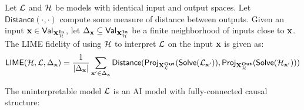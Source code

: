 \documentclass[twoside,11pt]{article}
\begin{document}
\begin{definition}

Let $\lowmodel$ and $\highmodel$ be models with identical input and output spaces. Let $\mathsf{Distance}(\cdot, \cdot)$ compute some measure of distance between outputs. Given an input $\pset \in \values{\inputvars_{\highmodel}}$, let $\Delta_{\pset} \subseteq \values{\inputvars_{\highmodel}}$ be a finite neighborhood of inputs close to $\pset$. The LIME fidelity of using $\highmodel$ to interpret $\lowmodel$ on the input $\pset$ is given as:
\[\mathsf{LIME}(\highmodel, \lowmodel, \Delta_{\pset}) = \frac{1}{|\Delta_{\pset}|}\sum_{\pset' \in \Delta_{\pset}}\mathsf{Distance}( \project{\sols(\lowmodel_{\pset'})}{ \outputvars_{\lowmodel}},\project{\sols(\highmodel_{\pset'})}{ \outputvars_{\highmodel}})\]
\end{definition}

The uninterpretable model $\lowmodel$ is an AI model with fully-connected causal structure:  
   
\end{document}
